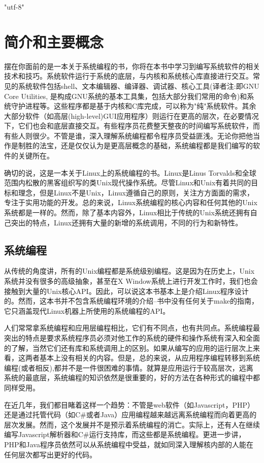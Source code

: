 \ifx\atempxetex\usewhat 
\XeTeXinputencoding "utf-8"
\fi
{}

\chapter{简介和主要概念}

摆在你面前的是一本关于系统编程的书，你将在本书中学习到编写系统软件的相关技术和技巧。系统软件运行于系统的底层，与内核和系统核心库直接进行交互。常见的系统软件包括shell、文本编辑器、编译器、调试器、核心工具(译者注:即GNU Core Utilities, 是构成GNU系统的基本工具集，包括大部分我们常用的命令)和系统守护进程等。这些程序都是基于内核和C库完成，可以称为"纯"系统软件。其余大部分软件（如高层(high-level)GUI应用程序）则运行在更高的层次，在必要情况下，它们也会和底层直接交互。有些程序员花费整天整夜的时间编写系统软件，而有些人则很少。不管是谁，深入理解系统编程都令程序员受益匪浅。无论你把他当作是制胜的法宝，还是仅仅认为是更高层概念的基础，系统编程都是我们编写的软件的关键所在。


确切的说，这是一本关于Linux上的系统编程的书。Linux是Linus Torvalds和全球范围内松散的黑客组织写的类Unix现代操作系统。尽管Linux和Unix有着共同的目标和理念，但是Linux不是Unix，Linux遵循自己的原则，关注方方面面的需求，专注于实用功能的开发。总的来说，Linux系统编程的核心内容和任何其他的Unix系统都是一样的。然而，除了基本内容外，Linux相比于传统的Unix系统还拥有自己突出的特点，Linux还拥有大量的新增的系统调用，不同的行为和新特性。 

\section{系统编程}
从传统的角度讲，所有的Unix编程都是系统级别编程。这是因为在历史上，Unix系统并没有很多的高级抽象，甚至在X Window系统上进行开发工作时，我们也会接触到大量的Unix核心API。因此，可以说这本书基本上是介绍Linux程序设计的。然而，这本书并不包含系统编程环境的介绍--书中没有任何关于make的指南，它只涵盖现代Linux机器上所使用的系统编程的API。

人们常常拿系统编程和应用层编程相比，它们有不同点，也有共同点。系统编程最突出的特点是要求系统程序员必须对他工作的系统的硬件和操作系统有深入和全面的了解，当然它们还有库和系统调用上的区别。如果从编写的应用的运行层次上来看，这两者基本上没有相关的内容。但是，总的来说，从应用程序编程转移到系统编程(或者相反),都并不是一件很困难的事情。就算是应用运行于较高层次，远离系统的最底层，系统编程的知识依然是很重要的，好的方法在各种形式的编程中都同样受用。

在近几年，我们都目睹着这样一个趋势：不管是web软件（如Javascript，PHP）还是通过托管代码（如C\#或者Java）应用编程越来越远离系统编程而向着更高的层次发展。然而，这个发展并不是预示着系统编程的消亡。实际上，还有人在继续编写Javascript解析器和C\#运行支持库，而这些都是系统编程。更进一步讲，PHP和Java程序员依然可以从系统编程中受益，就如同深入理解核内部的人能在任何层次都写出更好的代码。

